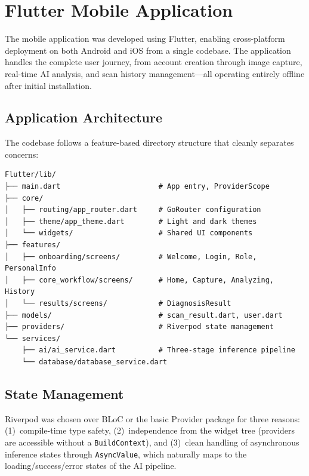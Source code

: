 \section{Flutter Mobile Application}
\label{sec:flutter}

The mobile application was developed using Flutter, enabling cross-platform deployment on both Android and iOS from a single codebase. The application handles the complete user journey, from account creation through image capture, real-time AI analysis, and scan history management---all operating entirely offline after initial installation.

\subsection{Application Architecture}

The codebase follows a feature-based directory structure that cleanly separates concerns:

\begin{verbatim}
Flutter/lib/
├── main.dart                       # App entry, ProviderScope
├── core/
│   ├── routing/app_router.dart     # GoRouter configuration
│   ├── theme/app_theme.dart        # Light and dark themes
│   └── widgets/                    # Shared UI components
├── features/
│   ├── onboarding/screens/         # Welcome, Login, Role, PersonalInfo
│   ├── core_workflow/screens/      # Home, Capture, Analyzing, History
│   └── results/screens/            # DiagnosisResult
├── models/                         # scan_result.dart, user.dart
├── providers/                      # Riverpod state management
└── services/
    ├── ai/ai_service.dart          # Three-stage inference pipeline
    └── database/database_service.dart
\end{verbatim}

\subsection{State Management}

Riverpod was chosen over BLoC or the basic Provider package for three reasons: (1)~compile-time type safety, (2)~independence from the widget tree (providers are accessible without a \texttt{BuildContext}), and (3)~clean handling of asynchronous inference states through \texttt{AsyncValue}, which naturally maps to the loading/success/error states of the AI pipeline.

